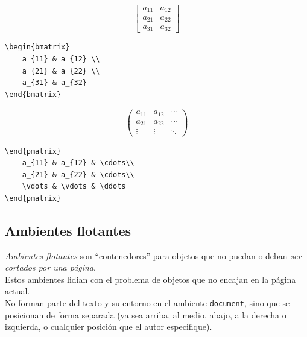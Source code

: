 \documentclass[../notes.tex]{subfiles}
\begin{document}
                \[ \begin{bmatrix}
                        a_{11} & a_{12} \\
                        a_{21} & a_{22} \\  
                        a_{31} & a_{32}
                    \end{bmatrix}
                \] 
\begin{verbatim}
\begin{bmatrix}
    a_{11} & a_{12} \\
    a_{21} & a_{22} \\  
    a_{31} & a_{32}
\end{bmatrix}
\end{verbatim}
    
        \[ \begin{pmatrix}
                        a_{11} & a_{12} & \cdots\\
                        a_{21} & a_{22} & \cdots\\  
                        \vdots & \vdots & \ddots
                    \end{pmatrix}
                \] 
\begin{verbatim}
\end{pmatrix}
    a_{11} & a_{12} & \cdots\\
    a_{21} & a_{22} & \cdots\\  
    \vdots & \vdots & \ddots
\end{pmatrix}
\end{verbatim}

    
    \subsection{Ambientes flotantes}
    
        \emph{Ambientes flotantes} son ``contenedores'' para objetos que no puedan o deban \emph{ser cortados por una página}.\\[\baselineskip]

        Estos ambientes lidian con el problema de objetos que no encajan en la página actual.\\[\baselineskip]

        No forman parte del texto y su entorno en el ambiente \texttt{document}, sino que se posicionan de forma separada (ya sea arriba, al medio, abajo, a la derecha o izquierda, o cualquier posición que el autor especifique).\\[\baselineskip]
\end{document}
